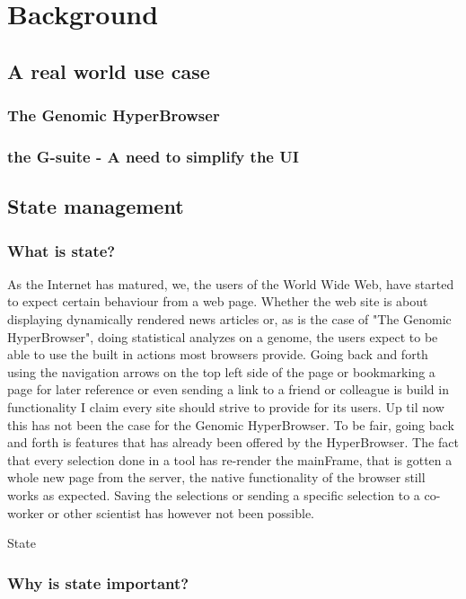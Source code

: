 \documentclass[english]{ifimaster}
\begin{document}

\chapter{Background}
\section{A real world use case}
\subsection{The Genomic HyperBrowser}
\subsection{the G-suite - A need to simplify the UI}
\section{State management}
\subsection{What is state?}

As the Internet has matured, we, the users of the World Wide Web, have started to expect certain behaviour from a web page\parencite[p.85]{mikowski}. Whether the web site is about displaying dynamically rendered news articles or, as is the case of "The Genomic HyperBrowser", doing statistical analyzes on a genome, the users expect to be able to use the built in actions most browsers provide. Going back and forth using the navigation arrows on the top left side of the page or bookmarking a page for later reference or even sending a link to a friend or colleague is build in functionality I claim every site should strive to provide for its users.\newline
\noindent Up til now this has not been the case for the Genomic HyperBrowser. To be fair, going back and forth is features that has already been offered by the HyperBrowser. The fact that every selection done in a tool has re-render the mainFrame, that is gotten a whole new page from the server, the native functionality of the browser still works as expected. Saving the selections or sending a specific selection to a co-worker or other scientist has however not been possible.

State

\subsection{Why is state important?}
\end{document}
